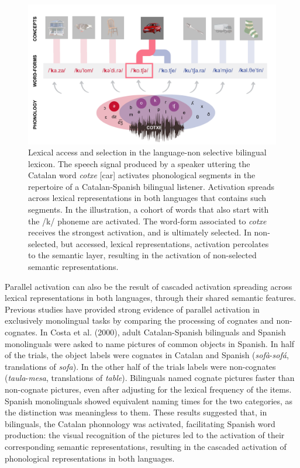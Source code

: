 \documentclass[
  12pt,
  b5paperpaper,
  twoside]{scrreprt}
\begin{document}
\begin{figure}

{\centering \includegraphics{chapters/../_assets/img/lexicon.png}

}

\caption{\label{fig-lexicon}Lexical access and selection in the
language-non selective bilingual lexicon. The speech signal produced by
a speaker uttering the Catalan word \emph{cotxe} {[}car{]} activates
phonological segments in the repertoire of a Catalan-Spanish bilingual
listener. Activation spreads across lexical representations in both
languages that contains such segments. In the illustration, a cohort of
words that also start with the /k/ phoneme are activated. The word-form
associated to \emph{cotxe} receives the strongest activation, and is
ultimately selected. In non-selected, but accessed, lexical
representations, activation percolates to the semantic layer, resulting
in the activation of non-selected semantic representations.}

\end{figure}

Parallel activation can also be the result of cascaded activation
spreading across lexical representations in both languages, through
their shared semantic features. Previous studies have provided strong
evidence of parallel activation in exclusively monolingual tasks by
comparing the processing of cognates and non-cognates. In Costa et al.
(2000), adult Catalan-Spanish bilinguals and Spanish monolinguals were
asked to name pictures of common objects in Spanish. In half of the
trials, the object labels were cognates in Catalan and Spanish
(\emph{sofà}-\emph{sofá}, translations of \emph{sofa}). In the other
half of the trials labels were non-cognates (\emph{taula}-\emph{mesa},
translations of \emph{table}). Bilinguals named cognate pictures faster
than non-cognate pictures, even after adjusting for the lexical
frequency of the items. Spanish monolinguals showed equivalent naming
times for the two categories, as the distinction was meaningless to
them. These results suggested that, in bilinguals, the Catalan
phonnology was activated, facilitating Spanish word production: the
visual recognition of the pictures led to the activation of their
corresponding semantic representations, resulting in the cascaded
activation of phonological representations in both languages.
\end{document}
